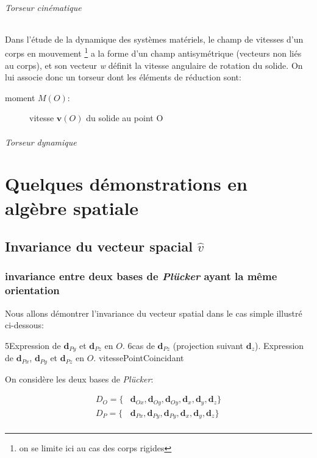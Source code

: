 \subparagraph{Torseur cinématique}

Dans l'étude de la dynamique des systèmes matériels, le champ de vitesses d'un corps en mouvement \footnote{on se limite ici au cas des corps rigides} a la forme d'un champ antisymétrique (vecteurs non liés au corps), et son vecteur \emph{w} définit la vitesse angulaire de rotation du solide. On lui associe donc un torseur dont les éléments de réduction sont:
\begin{description}
\item[moment $M(O)$:] vitesse $\textbf{v}(O)$ du solide au point O
\end{description}

\subparagraph{Torseur dynamique}



\chapter{Quelques démonstrations en algèbre spatiale} \label{appx_dem}

\section{Invariance du vecteur spacial $\widehat{v}$}

\subsection{invariance entre deux bases de \emph{Plücker} ayant la même orientation}

Nous allons démontrer l'invariance du vecteur spatial dans le cas simple illustré ci-dessous:

{5}{Expression de $\textbf{d}_{Py}$ et $\textbf{d}_{Pz}$ en $O$.}
{6}{cas de $\textbf{d}_{Pz}$ (projection suivant $\textbf{d}_{z}$).}
{Expression de $\textbf{d}_{Px}$, $\textbf{d}_{Py}$ et $\textbf{d}_{Pz}$ en $O$.}
{vitessePointCoincidant}

On considère les deux bases de \emph{Plücker}:

\begin{align*}
D_{O} = \lbrace &\textbf{d}_{Ox}, \textbf{d}_{Oy}, \textbf{d}_{Oy}, \textbf{d}_{x}, \textbf{d}_{y}, \textbf{d}_{z} \rbrace \\
D_{P} = \lbrace &\textbf{d}_{Px}, \textbf{d}_{Py}, \textbf{d}_{Py}, \textbf{d}_{x}, \textbf{d}_{y}, \textbf{d}_{z} \rbrace \\
\end{align*}

